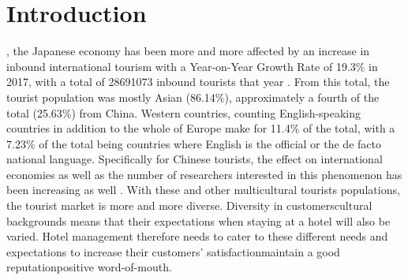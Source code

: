 \begin{abstract}


\end{abstract}

\linenumbers

\section{Introduction}\label{intro}

\DIFdelbegin {}\DIFdelend \DIFaddbegin {}\DIFaddend , the Japanese economy has been more and more affected by an increase in inbound international tourism \cite[][]{jones2009} with a Year-on-Year Growth Rate of 19.3\% in 2017, with a total of \num[group-separator={,}]{28691073} inbound tourists that year \cite[][]{jnto2003-2019}. From this total, the tourist population was mostly Asian (86.14\%), \DIFdelbegin {}\DIFdelend \DIFaddbegin {}\DIFaddend approximately a fourth of the total (25.63\%) \DIFdelbegin {}\DIFdelend \DIFaddbegin {}\DIFaddend from China. Western countries, counting English-speaking countries in addition to the whole of Europe make for 11.4\% of the total, with a 7.23\% of the total being countries where English is the official or the de facto national language. Specifically for Chinese tourists, the effect on international economies as well as the number of researchers interested in this phenomenon has been increasing as well \cite[][]{sun2017}. With these and other multicultural tourists populations, the tourist market is more and more diverse. Diversity in customers\DIFaddbegin {}\DIFaddend cultural backgrounds means that their expectations when staying at a hotel will also be varied. Hotel management therefore needs to cater to these different needs and expectations to increase their customers' satisfaction\DIFdelbegin {}\DIFdelend \DIFaddbegin \DIFadd{, }\DIFaddend maintain a good reputation\DIFdelbegin {}\DIFdelend \DIFaddbegin {}\DIFaddend positive word-of-mouth.

